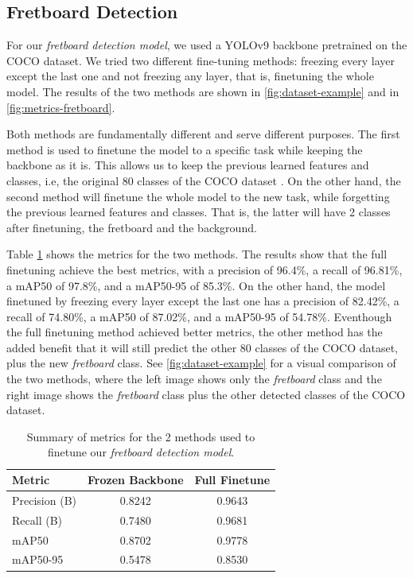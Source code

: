\documentclass[10pt,twocolumn,letterpaper]{article}
\begin{document}
\subsection{Fretboard Detection}
For our \emph{fretboard detection model}, we used a YOLOv9 backbone \cite{wang2024yolov9} pretrained on the COCO dataset. We tried two different fine-tuning methods: freezing every layer except the last one and not freezing any layer, that is, finetuning the whole model. The results of the two methods are shown in \cref{fig:dataset-example} and in \cref{fig:metrics-fretboard}. 

Both methods are fundamentally different and serve different purposes. The first method is used to finetune the model to a specific task while keeping the backbone as it is. This allows us to keep the previous learned features and classes, i.e, the original 80 classes of the COCO dataset \cite{lin2015microsoftcococommonobjects}. On the other hand, the second method will finetune the whole model to the new task, while forgetting the previous learned features and classes. That is, the latter will have 2 classes after finetuning, the fretboard and the background.

Table \ref{tab:fretboard-metrics} shows the metrics for the two methods. The results show that the full finetuning achieve the best metrics, with a precision of 96.4\%, a recall of 96.81\%, a mAP50 of 97.8\%, and a mAP50-95 of 85.3\%. On the other hand, the model finetuned by freezing every layer except the last one has a precision of 82.42\%, a recall of 74.80\%, a mAP50 of 87.02\%, and a mAP50-95 of 54.78\%. Eventhough the full finetuning method achieved better metrics, the other method has the added benefit that it will still predict the other 80 classes of the COCO dataset, plus the new \emph{fretboard} class. See \cref{fig:dataset-example} for a visual comparison of the two methods, where the left image shows only the \emph{fretboard} class and the right image shows the \emph{fretboard} class plus the other detected classes of the COCO dataset.

\begin{table}[h!]
    \centering
    \caption{Summary of metrics for the 2 methods used to finetune our \emph{fretboard detection model}.}
    \begin{tabular}{lcc}
        \toprule
        \textbf{Metric} & \textbf{Frozen Backbone} & \textbf{Full Finetune} \\
        \midrule
        Precision (B)   & 0.8242 & 0.9643 \\
        Recall (B)      & 0.7480 & 0.9681 \\
        mAP50           & 0.8702 & 0.9778 \\
        mAP50-95        & 0.5478 & 0.8530 \\
        \bottomrule
    \end{tabular}
    \label{tab:fretboard-metrics}
\end{table}
\end{document}
